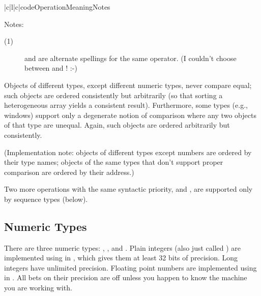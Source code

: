 \begin{tableiii}{|c|l|c|}{code}{Operation}{Meaning}{Notes}
\end{tableiii}
\opindex{==} %

\noindent
Notes:

\begin{description}

\item[(1)]
\code{<>} and \code{!=} are alternate spellings for the same operator.
(I couldn't choose between \ABC{} and \C{}! :-)

\end{description}

Objects of different types, except different numeric types, never
compare equal; such objects are ordered consistently but arbitrarily
(so that sorting a heterogeneous array yields a consistent result).
Furthermore, some types (e.g., windows) support only a degenerate
notion of comparison where any two objects of that type are unequal.
Again, such objects are ordered arbitrarily but consistently.

(Implementation note: objects of different types except numbers are
ordered by their type names; objects of the same types that don't
support proper comparison are ordered by their address.)

Two more operations with the same syntactic priority,  and
, are supported only by sequence types (below).

\subsection{Numeric Types}

There are three numeric types: , , and
.  Plain integers (also just called )
are implemented using  in \C{}, which gives them at least 32
bits of precision.  Long integers have unlimited precision.  Floating
point numbers are implemented using  in \C{}.  All bets on
their precision are off unless you happen to know the machine you are
working with.

